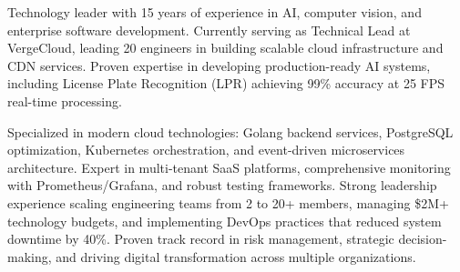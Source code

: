 

\begin{cvparagraph}

Technology leader with 15 years of experience in AI, computer vision, and enterprise software development. Currently serving as Technical Lead at VergeCloud, leading 20 engineers in building scalable cloud infrastructure and CDN services. Proven expertise in developing production-ready AI systems, including License Plate Recognition (LPR) achieving 99\% accuracy at 25 FPS real-time processing.

Specialized in modern cloud technologies: Golang backend services, PostgreSQL optimization, Kubernetes orchestration, and event-driven microservices architecture. Expert in multi-tenant SaaS platforms, comprehensive monitoring with Prometheus/Grafana, and robust testing frameworks. Strong leadership experience scaling engineering teams from 2 to 20+ members, managing \$2M+ technology budgets, and implementing DevOps practices that reduced system downtime by 40\%. Proven track record in risk management, strategic decision-making, and driving digital transformation across multiple organizations.

\end{cvparagraph}
